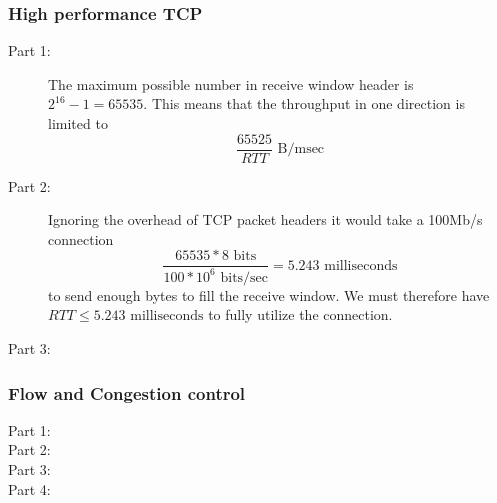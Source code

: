 \subsubsection{High performance TCP}
\begin{description}
    \item[Part 1:] The maximum possible number in receive window header is $2^{16}-1 = 65535$. This means that the throughput in one
        direction is limited to \[\frac{65525}{RTT} \text{ B/msec}\] %
    \item[Part 2:] Ignoring the overhead of TCP packet headers it would take a 100Mb/s connection
        \[ \frac{65535 * 8 \text{ bits}}{100 * 10^{6} \text{ bits/sec}} = 5.243 \text{ milliseconds} \]
        to send enough bytes to fill the receive window. We must therefore have $RTT \leq 5.243 \text{ milliseconds}$ to fully utilize
        the connection. %
    \item[Part 3:] 
\end{description}

\subsubsection{Flow and Congestion control}
\begin{description}
    \item[Part 1:] 
    \item[Part 2:] 
    \item[Part 3:] %
    \item[Part 4:] 
\end{description}

